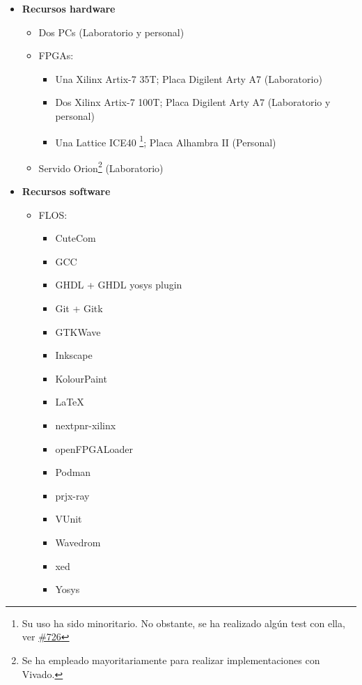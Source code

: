 \begin{itemize}
\item \textbf{Recursos hardware}
    \begin{itemize}
        \item Dos PCs (Laboratorio y personal)
        \item FPGAs:
            \begin{itemize}
                \item Una Xilinx Artix-7 35T; Placa Digilent Arty A7 (Laboratorio)
                \item Dos Xilinx Artix-7 100T; Placa Digilent Arty A7 (Laboratorio y personal)
                \item Una Lattice ICE40 \footnote{Su uso ha sido minoritario. No obstante, se ha realizado algún test con ella, ver \href{https://github.com/stnolting/neorv32/issues/726}{\#726}}; Placa Alhambra II (Personal)
            \end{itemize}
        \item Servido Orion\footnote{Se ha empleado mayoritariamente para realizar implementaciones con Vivado.} (Laboratorio) 
    \end{itemize}
\item \textbf{Recursos software}
    \begin{itemize}
        \item FLOS:
            \begin{itemize}
                \item CuteCom
                \item GCC
                \item GHDL + GHDL yosys plugin
                \item Git + Gitk
                \item GTKWave
                \item Inkscape
                \item KolourPaint
                \item \LaTeX
                \item nextpnr-xilinx
                \item openFPGALoader
                \item Podman
                \item prjx-ray
                \item VUnit
                \item Wavedrom
                \item xed
                \item Yosys

\end{itemize}
\end{itemize}
\end{itemize}
